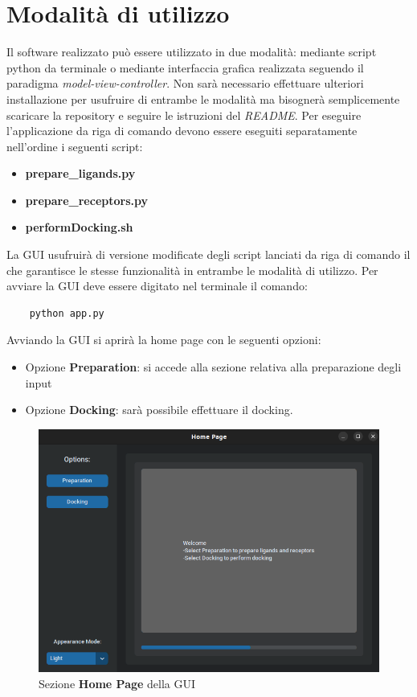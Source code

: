 \section{Modalità di utilizzo}\label{sec:3.2}
Il software realizzato può essere utilizzato in due modalità: mediante script python da terminale o mediante interfaccia grafica realizzata seguendo il paradigma \textit{model-view-controller}.\newline
Non sarà necessario effettuare ulteriori installazione per usufruire di entrambe le modalità ma bisognerà semplicemente scaricare la repository e seguire le istruzioni del \textit{README}.\newline
Per eseguire l'applicazione da riga di comando devono essere eseguiti separatamente nell'ordine i seguenti script:
\begin{itemize}
    \item \textbf{prepare\_ligands.py}
    \item \textbf{prepare\_receptors.py}
    \item \textbf{performDocking.sh}
\end{itemize}

La GUI usufruirà di versione modificate degli script lanciati da riga di comando il che garantisce le stesse funzionalità in entrambe le modalità di utilizzo.\newline
Per avviare la GUI deve essere digitato nel terminale il comando:

\begin{verbatim}
    python app.py    
\end{verbatim}

Avviando la GUI si aprirà la home page con le seguenti opzioni:

\begin{itemize}
    \item Opzione \textbf{Preparation}: si accede alla sezione relativa alla preparazione degli input
    \item Opzione \textbf{Docking}: sarà possibile effettuare il docking.
\end{itemize}

\begin{figure}[H]
    \centering
    \includegraphics[scale=0.6]{immagini/homePage.png}
    \caption{Sezione \textbf{Home Page} della GUI}
    \label{fig:Home Page}
\end{figure}

